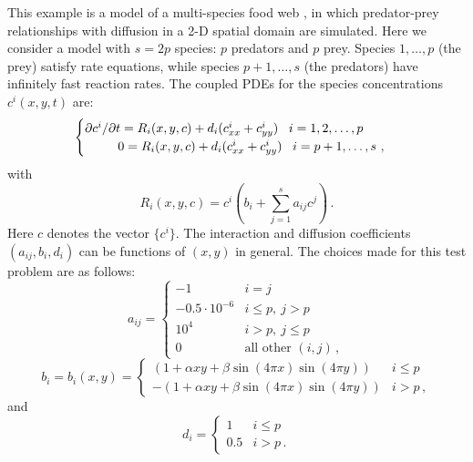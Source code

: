 This example is a model of a multi-species food web \cite{Bro:86}, in
which predator-prey relationships with diffusion in a 2-D spatial
domain are simulated.  Here we consider a model with $s = 2p$ species:
$p$ predators and $p$ prey.  Species $1,\ldots, p$ (the prey) satisfy
rate equations, while species $p+1,\ldots, s$ (the predators) have
infinitely fast reaction rates.  The coupled PDEs for the species
concentrations $c^i(x,y,t)$ are:
\begin{equation}\label{e:idabanx2_PDE}
  \begin{cases}
    \partial c^i / \partial t = R_i(x,y,c) + d_i 
    ( c^i_{xx} + c^i_{yy} ) \, ~~ i = 1,2,\ldots,p \\
    \hspace*{.36in}        0 = R_i(x,y,c) + d_i 
    ( c^i_{xx} + c^i_{yy} ) \, ~~ i = p+1,\ldots,s ~,
  \end{cases}
\end{equation}
with
\[
R_i(x,y,c) = c^i \left( b_i + \sum_{j=1}^s a_{ij} c^j \right) \, .
\]
Here $c$ denotes the vector $\{c^i\}$.
The interaction and diffusion coefficients $(a_{ij},b_i,d_i)$ can be
functions of $(x,y)$ in general. The choices made for this test
problem are as follows:
\begin{equation*}
  a_{ij} = 
  \begin{cases}
    -1                 & i=j \\
    -0.5 \cdot 10^{-6} & i \leq p , ~ j > p  \\
    10^4               & i > p , ~ j \leq p  \\
    0                  & \mbox{all other } (i,j) \, ,
  \end{cases}
\end{equation*}
\begin{equation*}
  b_i = b_i(x,y) = 
  \begin{cases}
    (1 + \alpha xy + \beta \sin(4\pi x)\sin(4\pi y) )  & i \leq p  \\
    - (1 + \alpha xy + \beta \sin(4\pi x)\sin(4\pi y) )  & i > p \, ,
  \end{cases}
\end{equation*}
and
\begin{equation*}
  d_i = 
  \begin{cases}
    1 & i \leq p  \\
    0.5 & i > p  \, .
  \end{cases}
\end{equation*}

